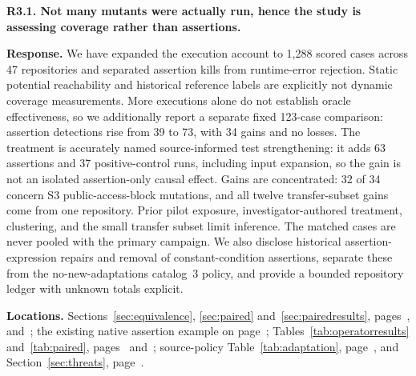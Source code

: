 \noindent\textbf{R3.1. Not many mutants were actually run, hence the study is assessing coverage rather than assertions.}\label{response:R3.1}\par
\textbf{Response.} We have expanded the execution account to 1,288 scored cases across 47 repositories and separated assertion kills from runtime-error rejection. Static potential reachability and historical reference labels are explicitly not dynamic coverage measurements. More executions alone do not establish oracle effectiveness, so we additionally report a separate fixed 123-case comparison: assertion detections rise from 39 to 73, with 34 gains and no losses. The treatment is accurately named source-informed test strengthening: it adds 63 assertions and 37 positive-control runs, including input expansion, so the gain is not an isolated assertion-only causal effect. Gains are concentrated: 32 of 34 concern S3 public-access-block mutations, and all twelve transfer-subset gains come from one repository. Prior pilot exposure, investigator-authored treatment, clustering, and the small transfer subset limit inference. The matched cases are never pooled with the primary campaign. We also disclose historical assertion-expression repairs and removal of constant-condition assertions, separate these from the no-new-adaptations catalog~3 policy, and provide a bounded repository ledger with unknown totals explicit.\par
\textbf{Locations.} Sections~\ref{sec:equivalence}, \ref{sec:paired} and~\ref{sec:pairedresults}, pages~\pageref{sec:equivalence}, \pageref{sec:paired} and~\pageref{sec:pairedresults}; the existing native assertion example on page~\pageref{sec:workedexample}; Tables~\ref{tab:operatorresults} and~\ref{tab:paired}, pages~\pageref{tab:operatorresults} and~\pageref{tab:paired}; source-policy Table~\ref{tab:adaptation}, page~\pageref{tab:adaptation}, and Section~\ref{sec:threats}, page~\pageref{sec:threats}.

